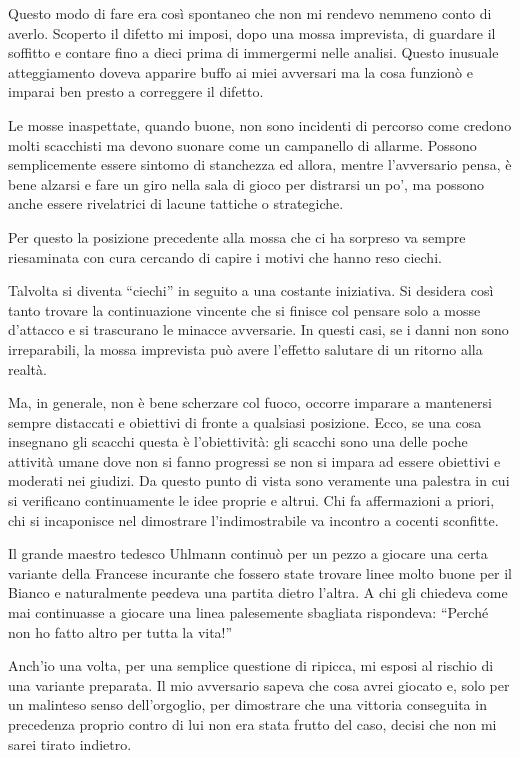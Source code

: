 Questo modo di fare era così spontaneo che non mi rendevo nemmeno conto
di averlo. Scoperto il difetto mi imposi, dopo una mossa imprevista, di
guardare il soffitto e contare fino a dieci prima di immergermi nelle
analisi. Questo inusuale atteggiamento doveva apparire buffo ai miei
avversari ma la cosa funzionò e imparai ben presto a correggere il
difetto.

Le mosse inaspettate, quando buone, non sono incidenti di percorso come
credono molti scacchisti ma devono suonare come un campanello di
allarme. Possono semplicemente essere sintomo di stanchezza ed allora,
mentre l'avversario pensa, è bene alzarsi e fare un giro nella sala di
gioco per distrarsi un po', ma possono anche essere rivelatrici di
lacune tattiche o strategiche.

Per questo la posizione precedente alla mossa che ci ha sorpreso va
sempre riesaminata con cura cercando di capire i motivi che hanno reso
ciechi.

Talvolta si diventa ``ciechi'' in seguito a una costante iniziativa. Si
desidera così tanto trovare la continuazione vincente che si finisce col
pensare solo a mosse d'attacco e si trascurano le minacce avversarie. In
questi casi, se i danni non sono irreparabili, la mossa imprevista può
avere l'effetto salutare di un ritorno alla realtà.

Ma, in generale, non è bene scherzare col fuoco, occorre imparare a
mantenersi sempre distaccati e obiettivi di fronte a qualsiasi
posizione. Ecco, se una cosa insegnano gli scacchi questa è
l'obiettività: gli scacchi sono una delle poche attività umane dove non
si fanno progressi se non si impara ad essere obiettivi e moderati nei
giudizi. Da questo punto di vista sono veramente una palestra in cui si
verificano continuamente le idee proprie e altrui. Chi fa affermazioni a
priori, chi si incaponisce nel dimostrare l'indimostrabile va incontro a
cocenti sconfitte.

Il grande maestro tedesco Uhlmann continuò per un pezzo a giocare una
certa variante della Francese incurante che fossero state trovare linee
molto buone per il Bianco e naturalmente pe¢deva una partita dietro
l'altra. A chi gli chiedeva come mai continuasse a giocare una linea
palesemente sbagliata rispondeva: ``Perché non ho fatto altro per tutta
la vita!''

Anch'io una volta, per una semplice questione di ripicca, mi esposi al
rischio di una variante preparata. Il mio avversario sapeva che cosa
avrei giocato e, solo per un malinteso senso dell'orgoglio, per
dimostrare che una vittoria conseguita in precedenza proprio contro di
lui non era stata frutto del caso, decisi che non mi sarei tirato
indietro.

